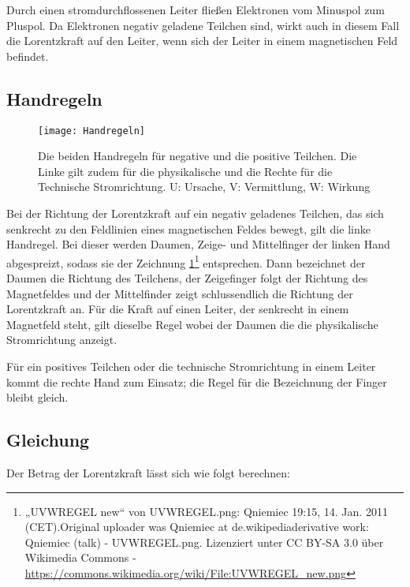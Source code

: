 Durch einen stromdurchflossenen Leiter fließen Elektronen vom Minuspol zum Pluspol. Da Elektronen negativ geladene Teilchen sind, wirkt auch in diesem Fall die Lorentzkraft auf den Leiter, wenn sich der Leiter in einem magnetischen Feld befindet.


\subsection{Handregeln}

\begin{figure}[h!]
	\centering
	\texttt{[image: Handregeln]}
	\caption{Die beiden Handregeln für negative und die positive Teilchen. Die Linke gilt zudem für die physikalische und die Rechte für die Technische Stromrichtung. U: Ursache, V: Vermittlung, W: Wirkung}
	\label{fig:Handregeln}
\end{figure}

Bei der Richtung der Lorentzkraft auf ein negativ geladenes Teilchen, das sich senkrecht zu den Feldlinien eines magnetischen Feldes bewegt, gilt die linke Handregel. Bei dieser werden Daumen, Zeige- und Mittelfinger der linken Hand abgespreizt, sodass sie der Zeichnung \ref{fig:Handregeln}\footnote{„UVWREGEL new“ von UVWREGEL.png: Qniemiec 19:15, 14. Jan. 2011 (CET).Original uploader was Qniemiec at de.wikipediaderivative work: Qniemiec (talk) - UVWREGEL.png. Lizenziert unter CC BY-SA 3.0 über Wikimedia Commons - \url{https://commons.wikimedia.org/wiki/File:UVWREGEL_new.png}} entsprechen. Dann bezeichnet der Daumen die Richtung des Teilchens, der Zeigefinger folgt der Richtung des Magnetfeldes und der Mittelfinder zeigt schlussendlich die Richtung der Lorentzkraft an. Für die Kraft auf einen Leiter, der senkrecht in einem Magnetfeld steht, gilt dieselbe Regel wobei der Daumen die die physikalische Stromrichtung anzeigt.

Für ein positives Teilchen oder die technische Stromrichtung in einem Leiter kommt die rechte Hand zum Einsatz; die Regel für die Bezeichnung der Finger bleibt gleich.


\subsection{Gleichung} \label{subsec:BLorentzDefinition}

Der Betrag der Lorentzkraft lässt sich wie folgt berechnen:

